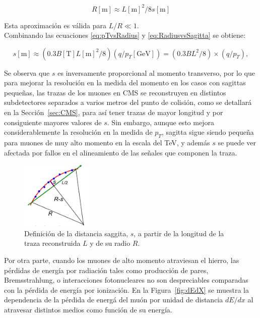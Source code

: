 \begin{equation}
  R[\text{m}]\approx L[\text{m}]^{2}/8s[\text{m}]
\label{eq:RadiusvsSagitta}
\end{equation}

Esta aproximaci\'on es v\'alida para $L/R \ll 1$. \\

Combinando las ecuaciones \eqref{eq:pTvsRadius} y \eqref{eq:RadiusvsSagitta} se obtiene:

\begin{equation}
  s[\text{m}]\approx (0.3 B [\text{T}] L[\text{m}]^{2}/8) (q/p_{T}[\text{GeV}]) =  (0.3 BL^{2}/8) \times (q/p_{T}),
\label{eq:SagittavsPt}
\end{equation}

Se observa que $s$ es inversamente proporcional al momento transverso, por lo que para mejorar la resoluci\'on en la medida del momento en los casos con sagittas peque\~nas, las trazas de los muones en CMS se reconstruyen en distintos subdetectores separados a varios metros del punto de colisi\'on, como se detallar\'a en la Secci\'on~\ref{sec:CMS}, para as\'i tener trazas de mayor longitud y por consiguiente mayores valores de $s$. Sin embargo, aunque esto mejora considerablemente la resoluci\'on en la medida de $p_{T}$, sagitta sigue siendo peque\~na para muones de muy alto momento en la escala del TeV, y adem\'as $s$ se puede ver afectada por fallos en el alineamiento de las se\~nales que componen la traza. \\

\begin{figure}[h]
\centering
\includegraphics[width=0.30\textwidth]{figures/curvaturesketch.png}
\caption{Definici\'on de la distancia saggita, $s$, a partir de la longitud de la traza reconstruida $L$ y de su radio $R$.}
\label{fig:SagittaDef}
\end{figure}

Por otra parte, cuando los muones de alto momento atraviesan el hierro, las p\'erdidas de energ\'ia por radiaci\'on tales como producci\'on de pares, Bremsstrahlung, o interacciones fotonucleares no son despreciables comparadas con la p\'erdida de energ\'ia por ionizaci\'on. En la Figura~\ref{fig:dEdX} se muestra la dependencia de la p\'erdida de energ\'a del mu\'on por unidad de distancia $dE/dx$ al atravesar distintos medios como funci\'on de su energ\'ia.

